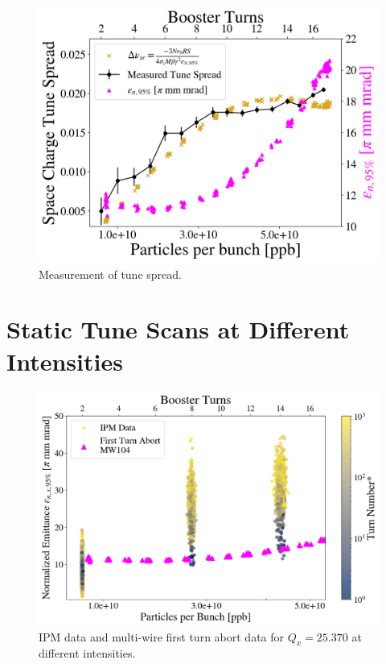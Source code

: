 \begin{figure}[H]
    \centering
    \includegraphics[width=\columnwidth]{chapter6/tune_spread.png}
    \caption{Measurement of tune spread.}
    \label{fig:tunespread}
\end{figure}

\section{Static Tune Scans at Different Intensities}

\begin{figure}[H]
    \centering
    \includegraphics[width=\columnwidth]{chapter6/25370_scatter.png}
    \caption{IPM data and multi-wire first turn abort data for $Q_x=25.370$ at different intensities.}
    \label{fig:25370_scatter}
\end{figure}


